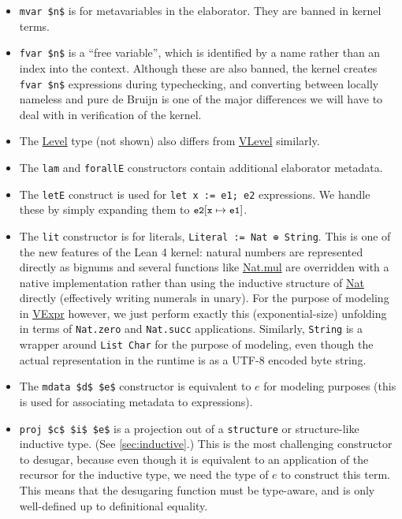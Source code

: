 \documentclass[sigplan,10pt,screen]{acmart}\settopmatter{printfolios=true,printccs=false,printacmref=false}
\newcommand{\code}[1]{\mbox{\ttfamily\small #1}}
\begin{document}
\begin{itemize}
  \item \lstinline|mvar $n$| is for metavariables in the elaborator. They are banned in kernel terms.
  \item \lstinline|fvar $n$| is a ``free variable'', which is identified by a name rather than an index into the context. Although these are also banned, the kernel creates \lstinline|fvar $n$| expressions during typechecking, and converting between locally nameless and pure de Bruijn is one of the major differences we will have to deal with in verification of the kernel.
  \item The \href{https://github.com/leanprover/lean4/blob/v4.20.1/src/Lean/Level.lean#L90}{\code{Level}} type (not shown) also differs from \href{https://github.com/digama0/lean4lean/blob/cpp2026/Lean4Lean/Theory/VExpr.lean#L6}{\code{VLevel}} similarly.
  \item The \lstinline|lam| and \lstinline|forallE| constructors contain additional elaborator metadata.
  \item The \lstinline|letE| construct is used for \lstinline|let x := e1; e2| expressions. We handle these by simply expanding them to $\code{e2}[\code{x}\mapsto \code{e1}]$.
  \item The \lstinline|lit| constructor is for literals, \lstinline|Literal := Nat ⊕ String|.
  This is one of the new features of the Lean 4 kernel: natural numbers are represented directly as bignums and several functions like \href{https://github.com/leanprover/lean4/blob/v4.20.1/src/Init/Prelude.lean#L1658-L1667}{\code{Nat.mul}} are overridden with a native implementation rather than using the inductive structure of \href{https://github.com/leanprover/lean4/blob/v4.20.1/src/Init/Prelude.lean#L1164}{\code{Nat}} directly (effectively writing numerals in unary). For the purpose of modeling in \href{https://github.com/digama0/lean4lean/blob/cpp2026/Lean4Lean/Theory/VExpr.lean#L6}{\code{VExpr}} however, we just perform exactly this (exponential-size) unfolding in terms of \lstinline|Nat.zero| and \lstinline|Nat.succ| applications. Similarly, \lstinline|String| is a wrapper around \lstinline|List Char| for the purpose of modeling, even though the actual representation in the runtime is as a UTF-8 encoded byte string.

  \item The \lstinline|mdata $d$ $e$| constructor is equivalent to $e$ for modeling purposes (this is used for associating metadata to expressions).
  \item \lstinline|proj $c$ $i$ $e$| is a projection out of a \lstinline|structure| or struc\-ture-like inductive type. (See \autoref{sec:inductive}.) This is the most challenging constructor to desugar, because even though it is equivalent to an application of the recursor for the inductive type, we need the type of $e$ to construct this term. This means that the desugaring function must be type-aware, and is only well-defined up to definitional equality.
\end{itemize}
\end{document}
